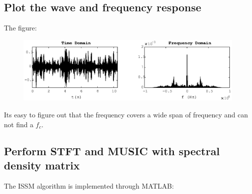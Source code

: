 \documentclass[UTF8]{article}
\begin{document}
\subsection{Plot the wave and frequency response}
The figure:
\begin{figure}[H]
    \centering 
    \includegraphics[scale=0.7]{img/fig03.eps}\\
\end{figure}
Its easy to figure out that the frequency covers a wide span of frequency and can not find a $f_c$.

\subsection{Perform STFT and MUSIC with spectral density matrix}
The ISSM algorithm is implemented through MATLAB:

\end{document}
